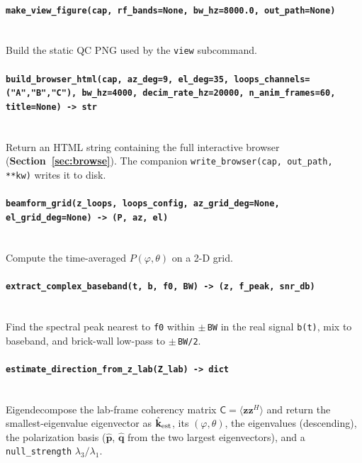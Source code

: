 \documentclass[11pt]{article}
\begin{document}
\paragraph{\texttt{make\_view\_figure(cap, rf\_bands=None, bw\_hz=8000.0, out\_path=None)}}\quad\\
Build the static QC PNG used by the \texttt{view} subcommand.

\paragraph{\texttt{build\_browser\_html(cap, az\_deg=9, el\_deg=35, loops\_channels=("A","B","C"), bw\_hz=4000, decim\_rate\_hz=20000, n\_anim\_frames=60, title=None) -> str}}\quad\\
Return an HTML string containing the full interactive browser
(\textbf{Section~\ref{sec:browse}}).  The companion
\texttt{write\_browser(cap, out\_path, **kw)} writes it to disk.

\paragraph{\texttt{beamform\_grid(z\_loops, loops\_config, az\_grid\_deg=None, el\_grid\_deg=None) -> (P, az, el)}}\quad\\
Compute the time-averaged $P(\varphi,\theta)$ on a 2-D grid.

\paragraph{\texttt{extract\_complex\_baseband(t, b, f0, BW) -> (z, f\_peak, snr\_db)}}\quad\\
Find the spectral peak nearest to \texttt{f0} within $\pm\,$\texttt{BW}
in the real signal \texttt{b(t)}, mix to baseband, and brick-wall
low-pass to $\pm\,$\texttt{BW/2}.

\paragraph{\texttt{estimate\_direction\_from\_z\_lab(Z\_lab) -> dict}}\quad\\
Eigendecompose the lab-frame coherency matrix
$\mathsf{C} = \langle\mathbf z\mathbf z^H\rangle$ and return the
smallest-eigenvalue eigenvector as $\hat{\mathbf k}_{\rm est}$, its
$(\varphi,\theta)$, the eigenvalues (descending), the polarization
basis ($\hat{\mathbf p}$, $\hat{\mathbf q}$ from the two largest
eigenvectors), and a \texttt{null\_strength} $\lambda_3/\lambda_1$.
\end{document}
